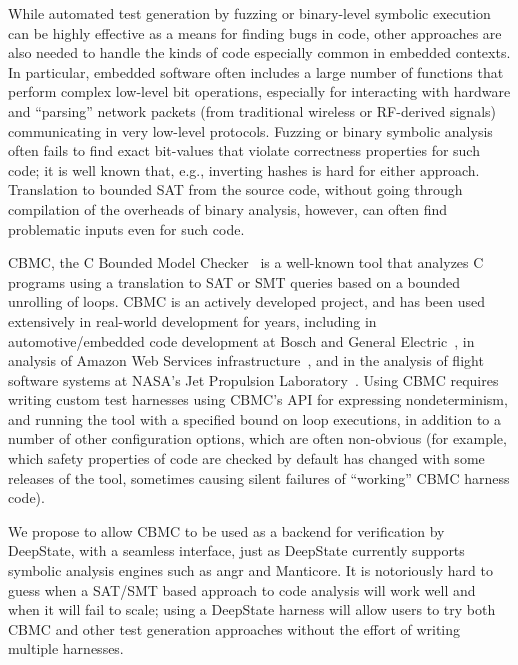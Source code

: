 While automated test generation by fuzzing or binary-level symbolic execution can be highly effective as a means for finding bugs in code, other approaches are also needed to handle the kinds of code especially common in embedded contexts.  In particular, embedded software often includes a large number of functions that perform complex low-level bit operations, especially for interacting with hardware and ``parsing'' network packets (from traditional wireless or RF-derived signals) communicating in very low-level protocols.  Fuzzing or binary symbolic analysis often fails to find exact bit-values that violate correctness properties for such code; it is well known that, e.g., inverting hashes is hard for either approach.  Translation to bounded SAT from the source code, without going through compilation of the overheads of binary analysis, however, can often find problematic inputs even for such code.

CBMC, the C Bounded Model Checker~\cite{cbmcp} is a well-known tool that analyzes C programs using a translation to SAT or SMT queries based on a bounded unrolling of loops. CBMC is an actively developed project, and has been used extensively in real-world development for years, including in automotive/embedded code development at Bosch and General Electric~\cite{tiemeyer2019crest}, in analysis of Amazon Web Services infrastructure~\cite{awsmodel}, and in the analysis of flight software systems at NASA's Jet Propulsion Laboratory~\cite{AMAI}.  Using CBMC requires writing custom test harnesses using CBMC's API for expressing nondeterminism, and running the tool with a specified bound on loop executions, in addition to a number of other configuration options, which are often non-obvious (for example, which safety properties of code are checked by default has changed with some releases of the tool, sometimes causing silent failures of ``working'' CBMC harness code).

We propose to allow CBMC to be used as a backend for verification by DeepState, with a seamless interface, just as DeepState currently supports symbolic analysis engines such as angr and Manticore.  It is notoriously hard to guess when a SAT/SMT based approach to code analysis will work well and when it will fail to scale; using a DeepState harness will allow users to try both CBMC and other test generation approaches without the effort of writing multiple harnesses.

